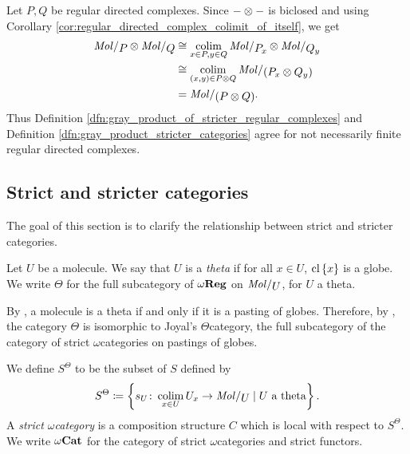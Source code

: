 \begin{rmk}
    Let \( P, Q \) be regular directed complexes.
    Since \( - \otimes - \) is biclosed and using Corollary \ref{cor:regular_directed_complex_colimit_of_itself}, we get
    \begin{align*}
        \molecin{P} \gray \molecin{Q} &\cong \colim_{x \in P, y \in Q} \molecin{\imel{P}{x}} \gray \molecin{\imel{Q}{y}} \\
                                      &\cong \colim_{(x, y) \in P \gray Q} \molecin{(\imel{P}{x} \gray \imel{Q}{y})} \\
                                      &= \molecin{(P \gray Q)}.
    \end{align*}
    Thus Definition \ref{dfn:gray_product_of_stricter_regular_complexes} and Definition \ref{dfn:gray_product_stricter_categories} agree for not necessarily finite regular directed complexes.
\end{rmk}

\subsection{Strict and stricter categories}

The goal of this section is to clarify the relationship between strict and stricter categories.

\begin{dfn} [Theta]
    Let \( U \) be a molecule.
    We say that \( U \) is a \emph{theta} if for all \( x \in U \), \( \mathrm{cl}\left\{ {x} \right\} \) is a globe.
    We write \( \Theta \) for the full subcategory of \( \omega\mathbf{Reg} \) on \( \molecin{U} \), for \( U \) a theta.
\end{dfn}

\begin{rmk} \label{rmk:theta_is_theta}
    By \cite[Corollary 9.1.29]{hadzihasanovic2024combinatorics}, a molecule is a theta if and only if it is a pasting of globes.
    Therefore, by \cite[Theorem 8.2.14, Lemma 9.1.16]{hadzihasanovic2024combinatorics}, the category \( \Theta \) is isomorphic to Joyal's \( \Theta \)\nbd category, the full subcategory of the category of strict \( \omega \)\nbd categories on pastings of globes.  
\end{rmk}

\begin{dfn} 
    We define \( S^\Theta \) to be the subset of \( S \) defined by 
    \begin{equation*}
        S^\Theta \eqdef \set{s_U \colon \colim_{x \in U} \imel{U}{x} \to \molecin{U} \mid U \text{ a theta}}.
    \end{equation*}  
    A \emph{strict \( \omega \)\nbd category} is a composition structure \( C \) which is local with respect to \( S^\Theta \).
    We write \( {\omega\mathbf{Cat}} \) for the category of strict \( \omega \)\nbd categories and strict functors.
\end{dfn}

